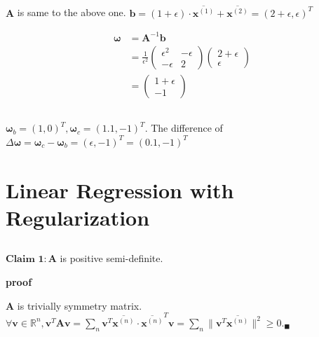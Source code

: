 \documentclass[12pt]{article}
\begin{document}
\subsection{}
$\boldsymbol{A}$ is same to the above one. $\boldsymbol{b} = (1+\epsilon)\cdot \overline{\boldsymbol{x}^{(1)}} + \overline{\boldsymbol{x}^{(2)}} = (2 + \epsilon,\epsilon)^T $

\begin{align}
    \boldsymbol{\omega} &= \boldsymbol{A}^{-1}\boldsymbol{b} \\ &= \frac{1}{\epsilon^2} \begin{pmatrix}
        \epsilon^2 & -\epsilon \\ -\epsilon & 2
        \end{pmatrix} \begin{pmatrix} 2 + \epsilon \\ \epsilon \end{pmatrix} \\ &= \begin{pmatrix} 1+\epsilon \\ -1 \end{pmatrix}
\end{align}

\subsection{}
$\boldsymbol{\omega}_{b} = (1,0)^T, \boldsymbol{\omega}_{c} = (1.1,-1)^T$.
The difference of $\Delta \boldsymbol{\omega} = \boldsymbol{\omega}_{c} - \boldsymbol{\omega}_{b} =(\epsilon,-1)^T = (0.1,-1)^T$ 


\section{Linear Regression with Regularization}
\subsection{}
$\textbf{Claim 1} : \boldsymbol{A}$ is positive semi-definite.

\noindent\textbf{proof}

$\boldsymbol{A}$ is trivially symmetry matrix. $\forall \boldsymbol{v} \in \mathbb{R}^n, \boldsymbol{v}^T \boldsymbol{A} \boldsymbol{v} = \sum_n \boldsymbol{v}^T \overline{\boldsymbol{x}^{(n)}} \cdot \overline{\boldsymbol{x}^{(n)}}^T \boldsymbol{v} = \sum_n \lVert\boldsymbol{v}^T \overline{\boldsymbol{x}^{(n)}} \rVert^2 \ge 0._\blacksquare$
\\
\end{document}

